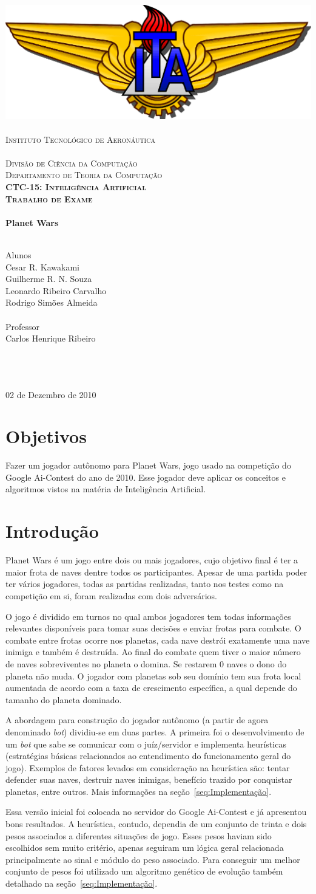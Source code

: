 \documentclass[a4paper,titlepage,11pt]{article}
\newcommand{\mydivision}{Divisão de Ciência da Computação\\Departamento de Teoria da Computação}
\newcommand{\mydiscipline}{CTC-15: Inteligência Artificial}
\newcommand{\mysupertitle}{Trabalho de Exame}
\newcommand{\mytitle}{Planet Wars}
\newcommand{\myname}{Cesar R. Kawakami\\Guilherme R. N. Souza\\Leonardo Ribeiro Carvalho\\Rodrigo Simões Almeida}
\newcommand{\myfieldAname}{Alunos}
\newcommand{\myfieldAcontent}{\myname}
\newcommand{\myfieldBname}{Professor}
\newcommand{\myfieldBcontent}{Carlos Henrique Ribeiro}
\newcommand{\myfieldCname}{\ }
\newcommand{\myfieldCcontent}{\ }
\newcommand{\mydate}{02 de Dezembro de 2010}
\renewcommand{\maketitle}{%
 	\begin{titlepage}
		\begin{center}
			\includegraphics[scale=0.125]{ita}\\
			\ \\ %
			\textsc{%
				\Large Instituto Tecnológico de Aeronáutica\\
				\large%
				\ \\
				\mydivision\\
				\textbf{\mydiscipline}\\
			}
			\vspace{2cm}
			\textbf{%
				\textsc{\large \mysupertitle}\\
				\ \\
				\huge \mytitle\\
				\ \\
			}
			\vspace{2cm}
			\begin{flushleft}
				\large \myfieldAname\\
				\Large \myfieldAcontent\\
				\ \\
				\large \myfieldBname\\
				\Large \myfieldBcontent\\
				\ \\
				\large \myfieldCname\\
				\Large \myfieldCcontent\\
			\end{flushleft}
			\vfill
			{\large \mydate}
		\end{center}		
	\end{titlepage}
}
\begin{document}
\maketitle

\section{Objetivos}

Fazer um jogador autônomo para Planet Wars, jogo usado na competição do Google Ai-Contest do ano de 2010. Esse jogador deve aplicar os conceitos e algoritmos vistos na matéria de Inteligência Artificial.

\section{Introdução}
Planet Wars é um jogo entre dois ou mais jogadores, cujo objetivo final é ter a maior frota de naves dentre todos os participantes. Apesar de uma partida poder ter vários jogadores, todas as partidas realizadas, tanto nos testes como na competição em si, foram realizadas com dois adversários. 

O jogo é dividido em turnos no qual ambos jogadores tem todas informações relevantes disponíveis para tomar suas decisões e enviar frotas para combate. O combate entre frotas ocorre nos planetas, cada nave destrói exatamente uma nave inimiga e também é destruída. Ao final do combate quem tiver o maior número de naves sobreviventes no planeta o domina. Se restarem 0 naves o dono do planeta não muda. O jogador com planetas sob seu domínio tem sua frota local aumentada de acordo com a taxa de crescimento específica, a qual depende do tamanho do planeta dominado.

A abordagem para construção do jogador autônomo (a partir de agora denominado {\em bot}) dividiu-se em duas partes. A primeira foi o desenvolvimento de um {\em bot} que sabe se comunicar com o juíz/servidor e implementa heurísticas (estratégias básicas relacionados ao entendimento do funcionamento geral do jogo). Exemplos de fatores levados em consideração na heurística são: tentar defender suas naves, destruir naves inimigas, benefício trazido por conquistar planetas, entre outros. Mais informações na seção~\ref{seq:Implementação}.

Essa versão inicial foi colocada no servidor do Google Ai-Contest e já apresentou bons resultados. A heurística, contudo, dependia de um conjunto de trinta e dois pesos associados a diferentes situações de jogo. Esses pesos haviam sido escolhidos sem muito critério, apenas seguiram um lógica geral relacionada principalmente ao sinal e módulo do peso associado. Para conseguir um melhor conjunto de pesos foi utilizado um algoritmo genético de evolução também detalhado na seção~\ref{seq:Implementação}.
\end{document}
